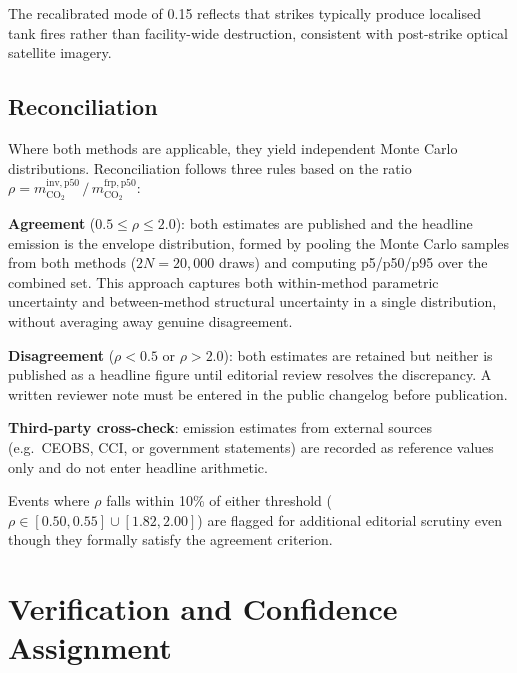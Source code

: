 \documentclass[11pt]{article}
\begin{document}
The recalibrated mode of 0.15 reflects that strikes typically produce
localised tank fires rather than facility-wide destruction, consistent
with post-strike optical satellite imagery.

\subsection{Reconciliation}
\label{sec:reconcile}

Where both methods are applicable, they yield independent Monte Carlo
distributions. Reconciliation follows three rules based on the ratio
$\rho = m_{\mathrm{CO_2}}^{\mathrm{inv,p50}}\,/\,
m_{\mathrm{CO_2}}^{\mathrm{frp,p50}}$:

\textbf{Agreement} ($0.5 \le \rho \le 2.0$): both estimates are
published and the headline emission is the envelope distribution, formed
by pooling the Monte Carlo samples from both methods ($2N = 20{,}000$
draws) and computing p5/p50/p95 over the combined set. This approach
captures both within-method parametric uncertainty and between-method
structural uncertainty in a single distribution, without averaging away
genuine disagreement.

\textbf{Disagreement} ($\rho < 0.5$ or $\rho > 2.0$): both estimates
are retained but neither is published as a headline figure until editorial
review resolves the discrepancy. A written reviewer note must be entered
in the public changelog before publication.

\textbf{Third-party cross-check}: emission estimates from external sources
(e.g.\ CEOBS, CCI, or government statements) are recorded as
reference values only and do not enter headline arithmetic.

Events where $\rho$ falls within 10\% of either threshold
($\rho \in [0.50, 0.55] \cup [1.82, 2.00]$) are flagged for additional
editorial scrutiny even though they formally satisfy the agreement
criterion.

\section{Verification and Confidence Assignment}
\label{sec:verify}
\end{document}
